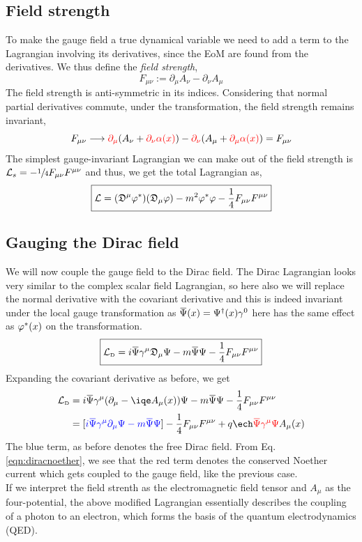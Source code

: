 \subsection{Field strength}
To make the gauge field a true dynamical variable we need to add a term to the Lagrangian involving its derivatives, since the EoM are found from the derivatives. We thus define the \textit{field strength},
$$F_{\mu\nu} := \partial_\mu A_\nu - \partial_\nu A_\mu$$
The field strength is anti-symmetric in its indices. Considering that normal partial derivatives commute, under the transformation, the field strength remains invariant,
$$F_{\mu\nu}\longrightarrow \mathcolor{red}{\partial_\mu} (A_\nu+\mathcolor{red}{\partial_\nu \alpha(x)}) - \mathcolor{red}{\partial_\nu} (A_\mu+ \mathcolor{red}{\partial_{\mu}\alpha(x)}) = F_{\mu\nu}$$
The simplest gauge-invariant Lagrangian we can make out of the field strength is $\mathcal L_{s} =-\sfrac{1}{4} F_{\mu\nu}F^{\mu\nu}$ and thus, we get the total Lagrangian as,
\begin{align}
    \boxed{\mathcal L = (\mathfrak{D}^\mu \varphi^*)(\mathfrak{D}_\mu \varphi) - m^2 \varphi^* \varphi -\frac{1}{4} F_{\mu\nu}F^{\mu\nu}}
\end{align}
\subsection{Gauging the Dirac field}
We will now couple the gauge field to the Dirac field. The Dirac Lagrangian looks very similar to the complex scalar field Lagrangian, so here also we will replace the normal derivative with the covariant derivative and this is indeed invariant under the local gauge transformation as $\dadj{\Psi}(x)= \Psi^\dagger (x)\gamma^0$ here has the same effect as $\varphi^*(x)$ on the transformation. 
$$\boxed{\SL\tund{D} = i \dadj{\Psi} \gamma^\mu \gcod_\mu\Psi -m\dadj{\Psi}\Psi -\frac{1}{4}F_{\mu\nu}F^{\mu\nu}}$$
Expanding the covariant derivative as before, we get 
\begin{align*}
    \SL\tund{D} &=  i \dadj{\Psi} \gamma^\mu (\partial_\mu - \iqe A_\mu(x))\Psi -m\dadj{\Psi}\Psi -\frac{1}{4}F_{\mu\nu}F^{\mu\nu}\\
    &= [\mathcolor{blue}{i \dadj{\Psi} \gamma^\mu \partial_\mu\Psi -m\dadj{\Psi}\Psi}] -\frac{1}{4}F_{\mu\nu}F^{\mu\nu} +q\ech\mathcolor{red}{\dadj{\Psi}\gamma^\mu \Psi} A_\mu(x)
\end{align*}
The blue term, as before denotes the free Dirac field. From Eq. \ref{eqn:diracnoether}, we see that the red term denotes the conserved Noether current which gets coupled to the gauge field, like the previous case. \\[0.2cm]
If we interpret the field strenth as the electromagnetic field tensor and $A_\mu$ as the four-potential, the above modified Lagrangian essentially describes the coupling of a photon to an electron, which forms the basis of the quantum electrodynamics (QED).
